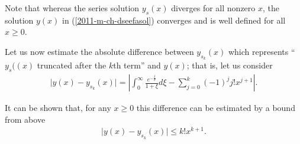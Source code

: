 Note that whereas the series solution $y_s(x)$ diverges for all nonzero $x$,
the solution $y(x)$ in (\ref{2011-m-ch-dseefasol})
converges and is well defined for all $x\ge 0$.

Let us now estimate the absolute difference between $y_{s_k}(x)$
which represents  ``$y_s((x)$ truncated
after the $k$th term'' and $y(x)$; that is, let us consider
\begin{equation}
\begin{array}{l}
\vert y(x) - y_{s_k}(x) \vert=
\left\vert \int_0^\infty
\frac{e^{-\frac{\xi}{x}}}{1+\xi} d\xi
-
\sum_{j=0}^k (-1)^j j! x^{j+1} \right\vert .
\end{array}
\label{2011-m-ch-dseeanest}
\end{equation}

It can be shown \cite{rousseau-2004}
that, for any $x\ge 0$ this difference can be estimated by  a bound from above
\begin{equation}
\begin{array}{l}
\vert y(x) - y_{s_k}(x) \vert
\le
k! x^{k+1}.
\end{array}
\label{2011-m-ch-dseeest}
\end{equation}

